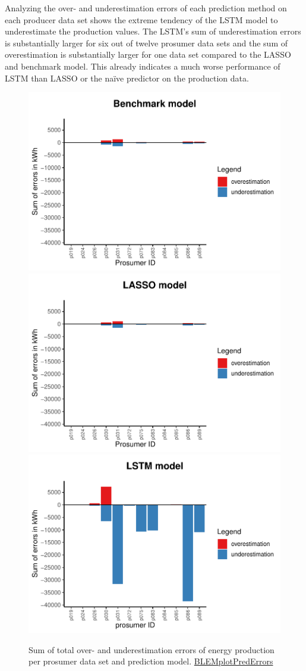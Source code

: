 Analyzing the over- and underestimation errors of each prediction method on each producer data set shows the extreme tendency of the LSTM model to underestimate the production values. The LSTM's sum of underestimation errors is substantially larger for six out of twelve prosumer data sets and the sum of overestimation is substantially larger for one data set compared to the LASSO and benchmark model. This already indicates a much worse performance of LSTM than LASSO or the na\"ive predictor on the production data.
%
\begin{figure}
    \centering
    \includegraphics[width=.5\textwidth]{thesis/graphs/evaluation/p_barplot_naive_overunderestimation.pdf}\\\vspace{.6cm}
    \includegraphics[width=.5\textwidth]{thesis/graphs/evaluation/p_barplot_LASSO_overunderestimation.pdf}\\\vspace{.6cm}
    \includegraphics[width=.5\textwidth]{thesis/graphs/evaluation/p_barplot_LSTM_overunderestimation.pdf}
    \caption[Sum of total over- and underestimation errors per prosumer data set]{Sum of total over- and underestimation errors of energy production per prosumer data set and prediction model. \quantnet\href{}{BLEMplotPredErrors}}
    \label{Fig:overunderestimation_p}
\end{figure}
%

